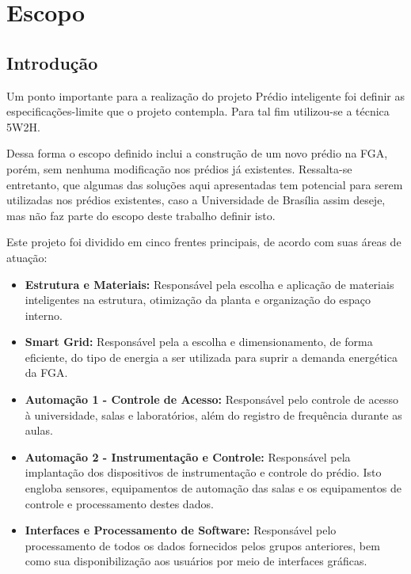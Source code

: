 \chapter{Escopo}
\section{Introdução}

Um ponto importante para a realização do projeto Prédio inteligente foi definir as
especificações-limite que o projeto contempla. Para tal fim utilizou-se a técnica 5W2H.

Dessa forma o escopo definido inclui a construção de um novo prédio na FGA, porém,
sem nenhuma modificação nos prédios já existentes. Ressalta-se entretanto, que algumas das soluções
aqui apresentadas tem potencial para serem utilizadas nos prédios existentes, caso a Universidade
de Brasília assim deseje, mas não faz parte do escopo deste trabalho definir isto.

Este projeto foi dividido em cinco frentes principais, de acordo com suas áreas de atuação:
\begin{itemize}
  \item \textbf{Estrutura e Materiais:} Responsável pela escolha e aplicação de materiais inteligentes na estrutura,
  otimização da planta e organização do espaço interno.

  \item \textbf{Smart Grid:} Responsável pela a  escolha e dimensionamento, de forma eficiente, do tipo de energia
  a ser utilizada para suprir a demanda energética da FGA.

  \item \textbf{Automação 1 - Controle de Acesso:} Responsável pelo controle de acesso à universidade, salas e
  laboratórios, além do registro de frequência durante as aulas.

  \item \textbf{Automação 2 - Instrumentação e Controle:} 	Responsável pela implantação dos dispositivos de
  instrumentação e controle do prédio. Isto engloba sensores, equipamentos de automação das salas e os
  equipamentos de controle e processamento destes dados.

  \item \textbf{Interfaces e Processamento de Software:} Responsável pelo processamento de todos os dados fornecidos
  pelos grupos anteriores, bem como sua disponibilização aos usuários por meio de interfaces gráficas.
\end{itemize}

